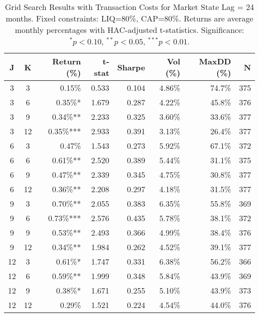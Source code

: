 \begin{table}[htbp]
\caption{Grid Search Results with Transaction Costs for Market State Lag = 24 months. Fixed constraints: LIQ=80\%, CAP=80\%. Returns are average monthly percentages with HAC-adjusted t-statistics. Significance: $^{*}p<0.10$, $^{**}p<0.05$, $^{***}p<0.01$.}
\label{tab:grid_costs_lag24}
\begin{tabular}{cc|rrrrrr}
\toprule
J & K & Return (\%) & t-stat & Sharpe & Vol (\%) & MaxDD (\%) & N \\
\midrule
3 & 3 & 0.15\% & 0.533 & 0.104 & 4.86\% & 74.7\% & 375 \\
3 & 6 & 0.35\%* & 1.679 & 0.287 & 4.22\% & 45.8\% & 376 \\
3 & 9 & 0.34\%** & 2.233 & 0.325 & 3.60\% & 33.6\% & 377 \\
3 & 12 & 0.35\%*** & 2.933 & 0.391 & 3.13\% & 26.4\% & 377 \\
6 & 3 & 0.47\% & 1.543 & 0.273 & 5.92\% & 67.1\% & 372 \\
6 & 6 & 0.61\%** & 2.520 & 0.389 & 5.44\% & 31.1\% & 375 \\
6 & 9 & 0.47\%** & 2.339 & 0.345 & 4.75\% & 30.8\% & 377 \\
6 & 12 & 0.36\%** & 2.208 & 0.297 & 4.18\% & 31.5\% & 377 \\
9 & 3 & 0.70\%** & 2.055 & 0.383 & 6.35\% & 55.8\% & 369 \\
9 & 6 & 0.73\%*** & 2.576 & 0.435 & 5.78\% & 38.1\% & 372 \\
9 & 9 & 0.53\%** & 2.493 & 0.366 & 4.99\% & 38.4\% & 376 \\
9 & 12 & 0.34\%** & 1.984 & 0.262 & 4.52\% & 39.1\% & 377 \\
12 & 3 & 0.61\%* & 1.747 & 0.331 & 6.38\% & 56.2\% & 366 \\
12 & 6 & 0.59\%** & 1.999 & 0.348 & 5.84\% & 43.9\% & 369 \\
12 & 9 & 0.38\%* & 1.671 & 0.255 & 5.10\% & 43.9\% & 373 \\
12 & 12 & 0.29\% & 1.521 & 0.224 & 4.54\% & 44.0\% & 376 \\
\bottomrule
\end{tabular}
\end{table}
